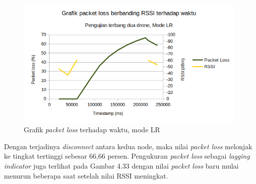 \begin{figure}[H]
	\centering
	\includegraphics[scale=0.7]{./assets/Graphs/1Fly_LR/PacketLoss-Time}
	\caption{Grafik \textit{packet loss} terhadap waktu, mode LR}
\end{figure}
Dengan terjadinya \textit{disconnect} antara kedua node, maka nilai \textit{packet loss} melonjak ke tingkat tertinggi sebesar 66,66 persen. Pengukuran \textit{packet loss} sebagai \textit{lagging indicator} juga terlihat pada Gambar 4.33 dengan nilai \textit{packet loss} baru mulai menurun beberapa saat setelah nilai RSSI meningkat.

